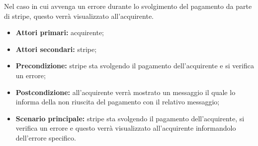 Nel caso in cui avvenga un errore durante lo svolgimento del pagamento da parte di stripe, questo verrà visualizzato all'acquirente.
\begin{itemize}
	\item \textbf{Attori primari:} acquirente;
	\item \textbf{Attori secondari:} stripe;
	\item \textbf{Precondizione:} stripe sta svolgendo il pagamento dell'acquirente e si verifica un errore;
	\item \textbf{Postcondizione:} all'acquirente verrà mostrato un messaggio il quale lo informa della non riuscita del pagamento con il relativo messaggio;
	\item \textbf{Scenario principale:} stripe sta svolgendo il pagamento dell'acquirente, si verifica un errore e questo verrà visualizzato all'acquirente informandolo dell'errore specifico.
\end{itemize}
